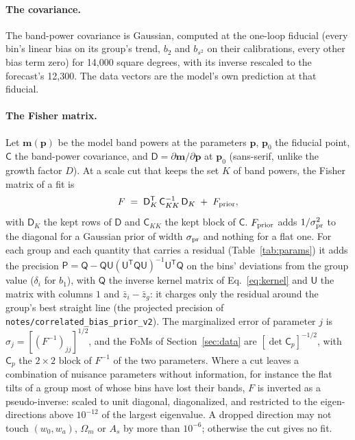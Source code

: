 \documentclass[11pt]{article}
\newcommand{\bstwo}{b_{s^2}}
\newcommand{\T}{^{\mathsf{T}}}
\newcommand{\AreaCov}{14{,}000}
\newcommand{\AreaSurvey}{12{,}300}
\newcommand{\PinvTol}{10^{-12}}
\newcommand{\PinvTouch}{10^{-6}}
\begin{document}
\paragraph{The covariance.}
The band-power covariance is Gaussian, computed at the one-loop
fiducial (every bin's linear bias on its group's trend, $b_2$ and
$\bstwo$ on their calibrations, every other bias term zero) for
\AreaCov{} square degrees, with its inverse rescaled to the forecast's
\AreaSurvey{}.  The data vectors are the model's own prediction at
that fiducial.

\paragraph{The Fisher matrix.}
Let $\mathbf{m}(\mathbf{p})$ be the model band powers at the parameters
$\mathbf{p}$, $\mathbf{p}_0$ the fiducial point, $\mathsf{C}$ the
band-power covariance, and $\mathsf{D} = \partial\mathbf{m}/\partial
\mathbf{p}$ at $\mathbf{p}_0$ (sans-serif, unlike the growth factor
$D$).  At a scale cut that keeps the set $K$ of band powers, the Fisher
matrix of a fit is
\begin{equation}
  F \;=\; \mathsf{D}_K\T\,\mathsf{C}_{KK}^{-1}\,\mathsf{D}_K
  \;+\; F_{\rm prior} ,
  \label{eq:fisher}
\end{equation}
with $\mathsf{D}_K$ the kept rows of $\mathsf{D}$ and $\mathsf{C}_{KK}$
the kept block of $\mathsf{C}$.  $F_{\rm prior}$ adds
$1/\sigma_{\rm pr}^2$ to the diagonal for a Gaussian prior of width
$\sigma_{\rm pr}$ and nothing for a flat one.  For each group and each
quantity that carries a residual (Table~\ref{tab:params}) it adds the
precision $\mathsf{P} = \mathsf{Q} - \mathsf{Q}\mathsf{U}(\mathsf{U}\T
\mathsf{Q}\mathsf{U})^{-1}\mathsf{U}\T\mathsf{Q}$ on the bins'
deviations from the group value ($\delta_i$ for $b_1$), with
$\mathsf{Q}$ the inverse kernel matrix of Eq.~\eqref{eq:kernel} and
$\mathsf{U}$ the matrix with columns $1$ and $\bar{z}_i - \bar{z}_g$:
it charges only the residual around the group's best straight line
(the projected precision of \texttt{notes/correlated\_bias\_prior\_v2}).
The marginalized error of parameter $j$ is
$\sigma_j = [(F^{-1})_{jj}]^{1/2}$, and the FoMs of
Section~\ref{sec:data} are $[\det \mathsf{C}_p]^{-1/2}$, with
$\mathsf{C}_p$ the $2 \times 2$ block of $F^{-1}$ of the two
parameters.  Where a cut leaves a combination of nuisance parameters
without information, for instance the flat tilts of a group most of
whose bins have lost their bands, $F$ is inverted as a pseudo-inverse:
scaled to unit diagonal, diagonalized, and restricted to the
eigen-directions above $\PinvTol$ of the largest eigenvalue.  A dropped
direction may not touch $(w_0, w_a)$, $\Omega_m$ or $A_s$ by more than
$\PinvTouch$; otherwise the cut gives no fit.
\end{document}
